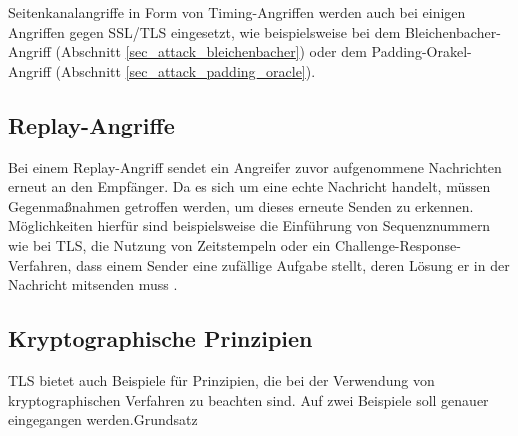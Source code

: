Seitenkanalangriffe in Form von Timing-Angriffen werden auch bei einigen Angriffen gegen SSL/TLS eingesetzt, wie beispielsweise bei dem Bleichenbacher-Angriff (Abschnitt \ref{sec_attack_bleichenbacher}) oder dem Padding-Orakel-Angriff (Abschnitt \ref{sec_attack_padding_oracle}).

\subsection{Replay-Angriffe}

Bei einem Replay-Angriff sendet ein Angreifer zuvor aufgenommene Nachrichten erneut an den Empfänger. Da es sich um eine echte Nachricht handelt, müssen Gegenmaßnahmen getroffen werden, um dieses erneute Senden zu erkennen. Möglichkeiten hierfür sind beispielsweise die Einführung von Sequenznummern wie bei TLS, die Nutzung von Zeitstempeln oder ein Challenge-Response-Verfahren, dass einem Sender eine zufällige Aufgabe stellt, deren Lösung er in der Nachricht mitsenden muss \cite{ferguson10}.

\subsection{Kryptographische Prinzipien}
\label{sec_didactics_crypto}


TLS bietet auch Beispiele für Prinzipien, die bei der Verwendung von kryptographischen Verfahren zu beachten sind. Auf zwei Beispiele soll genauer eingegangen werden.Grundsatz

